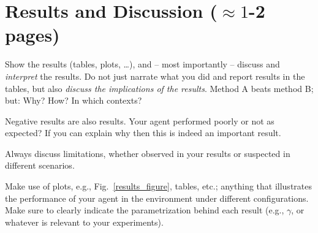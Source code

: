 \documentclass[../CSC_52081_EP.tex]{subfiles}
\begin{document}
    \section{Results and Discussion ($\approx 1$-2 pages)}

    Show the results (tables, plots, \ldots), and -- most importantly -- discuss and \emph{interpret} the results. Do not just narrate what you did and report results in the tables, but also \emph{discuss the implications of the results}. Method A beats method B; but: Why? How? In which contexts?

    Negative results are also results. Your agent performed poorly or not as expected? If you can explain why then this is indeed an important result. 

    Always discuss limitations, whether observed in your results or suspected in different scenarios. 

    Make use of plots, e.g., Fig.~\ref{results_figure}, tables, etc.; anything that illustrates the performance of your agent in the environment under different configurations. Make sure to clearly indicate the parametrization behind each result (e.g., $\gamma$, or whatever is relevant to your experiments). 


\end{document}
